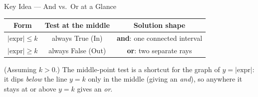 \documentclass[11pt]{article}
\begin{document}
\vspace{6pt}
\begin{stepbox}{Key Idea --- And vs.\ Or at a Glance}
\begin{center}
\renewcommand{\arraystretch}{1.3}
\begin{tabular}{|c|c|c|}
\hline
\textbf{Form} & \textbf{Test at the middle} & \textbf{Solution shape}\\\hline
$\lvert \text{expr}\rvert \le k$ & always True (In) & \textbf{and}: one connected interval\\\hline
$\lvert \text{expr}\rvert \ge k$ & always False (Out) & \textbf{or}: two separate rays\\\hline
\end{tabular}
\end{center}
(Assuming $k>0$.) The middle-point test is a shortcut for the graph of $y=\lvert\text{expr}\rvert$: it
dips \emph{below} the line $y=k$ only in the middle (giving an \emph{and}), so anywhere it stays at or
above $y=k$ gives an \emph{or}.
\end{stepbox}
\end{document}
